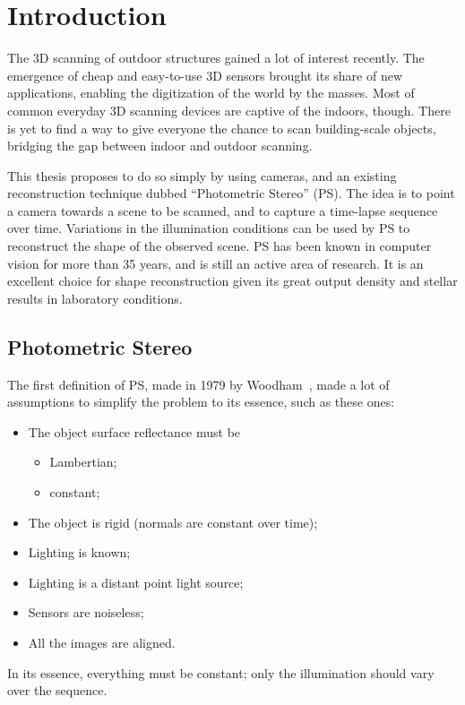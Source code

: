 
\chapter{Introduction}

The 3D scanning of outdoor structures gained a lot of interest recently. The emergence of cheap and easy-to-use 3D sensors brought its share of new applications, enabling the digitization of the world by the masses. Most of common everyday 3D scanning devices are captive of the indoors, though. There is yet to find a way to give everyone the chance to scan building-scale objects, bridging the gap between indoor and outdoor scanning.

This thesis proposes to do so simply by using cameras, and an existing reconstruction technique dubbed ``Photometric Stereo'' (PS). The idea is to point a camera towards a scene to be scanned, and to capture a time-lapse sequence over time. Variations in the illumination conditions can be used by PS to reconstruct the shape of the observed scene. PS has been known in computer vision for more than 35 years, and is still an active area of research. It is an excellent choice for shape reconstruction given its great output density and stellar results in laboratory conditions.

\section{Photometric Stereo}
\label{sec:ps_ori}

The first definition of PS, made in 1979 by Woodham~\cite{Woodham1979}, made a lot of assumptions to simplify the problem to its essence, such as these ones:
\begin{itemize} \setlength\itemsep{-0.2em}
  \item The object surface reflectance must be
  \vspace{-0.65em}\begin{itemize} \setlength\itemsep{0.1em}
    \item Lambertian;
    \item constant;
  \end{itemize} \vspace{-0.4em}
  \item The object is rigid (normals are constant over time);
  \item Lighting is known;
  \item Lighting is a distant point light source;
  \item Sensors are noiseless;
  \item All the images are aligned.
\end{itemize}
In its essence, everything must be constant; only the illumination should vary over the sequence.

